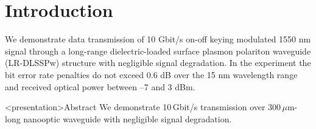 



\section*{Introduction}
  We demonstrate data transmission of 10 Gbit/s on-off keying modulated
  1550 nm signal through a long-range dielectric-loaded surface
  plasmon polariton waveguide (LR-DLSSPw) structure with negligible signal
  degradation. In the experiment the bit error rate penalties do not exceed
  0.6 dB over the 15 nm wavelength range and received optical power
  between --7 and 3 dBm.
  \begin{frame}<presentation>{Abstract}
    We demonstrate 10\,Gbit/s transmission over 300\,$\mu$m-long nanooptic waveguide with negligible signal degradation.
  \end{frame}


